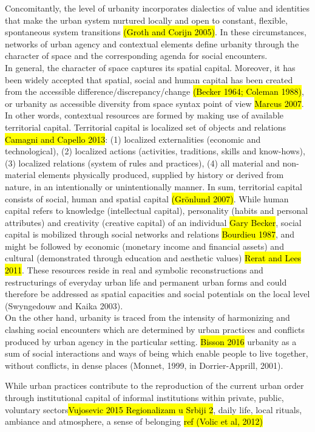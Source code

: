 \documentclass[11pt]{report}
\begin{document}
Concomitantly, the level of urbanity incorporates dialectics of value and identities that make the urban system nurtured locally and open to constant, flexible, spontaneous system transitions \hl{(Groth and Corijn 2005)}.
In these circumstances, networks of urban agency and contextual elements define urbanity through the character of space and the corresponding agenda for social encounters.
\\
In general, the character of space captures its spatial capital.
Moreover, it has been widely accepted that spatial, social and human capital has been created from the accessible difference/discrepancy/change \hl{(Becker 1964; Coleman 1988)}, or urbanity as accessible diversity from space syntax point of view \hl{Marcus 2007}. In other words, contextual resources are formed by making use of available territorial capital.
Territorial capital is localized set of objects and relations \hl{Camagni and Capello 2013}: (1) localized externalities (economic and technological), (2) localized actions (activities, traditions, skills and know-hows), (3) localized relations (system of rules and practices), (4) all material and non-material elements physically produced, supplied by history or derived from nature, in an intentionally or unintentionally manner.
In sum, territorial capital consists of social, human and spatial capital \hl{(Grönlund 2007)}. While human capital refers to knowledge (intellectual capital), personality (habits and personal attributes) and creativity (creative capital) of an individual \hl{Gary Becker}, social capital is mobilized through social networks and relations \hl{Bourdieu 1987}, and might be followed by economic (monetary income and  financial  assets) and cultural (demonstrated through education and aesthetic values) \hl{Rerat and Lees 2011}.
These resources reside in real and symbolic reconstructions and restructurings of everyday urban life and permanent urban forms and could therefore be addressed as spatial capacities and social potentials on the local level (Swyngedouw and Kaika 2003).
\\
On the other hand, urbanity is traced from the intensity of harmonizing and clashing social encounters which are determined by urban practices and conflicts produced by urban agency in the particular setting. 
\hl{Bisson 2016}
urbanity as a sum of social interactions and ways of being which enable people  to  live  together,  without  conflicts,  in  dense 
places (Monnet, 1999, in Dorrier-Apprill, 2001). 

While urban practices contribute to the reproduction of the current urban order through institutional capital of informal institutions within private, public, voluntary sectors\hl{Vujosevic 2015 Regionalizam u Srbiji 2}, daily life, local rituals, ambiance and atmosphere, a sense of belonging \hl{ref (Volic et al, 2012)}
\end{document}
